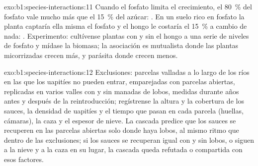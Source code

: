 \begin{solution}{exo:b1:species-interactions:11}
Cuando el fosfato limita el crecimiento, el \qty{80}{\%} del fosfato vale
mucho más que el \qty{15}{\%} del azúcar: . En un suelo rico en
fosfato la planta captaría ella misma el fosfato y el hongo le costaría el
\qty{15}{\%} a cambio de nada: . Experimento: cultívense plantas
con y sin el hongo a una serie de niveles de fosfato y mídase la biomasa; la
asociación es mutualista donde las plantas micorrizadas crecen más, y
parásita donde crecen menos.
\end{solution}

\begin{solution}{exo:b1:species-interactions:12}
Exclusiones: parcelas valladas a lo largo de los ríos en las que los
uapitíes no pueden entrar, emparejadas con parcelas abiertas, replicadas en
varios valles con y sin manadas de lobos, medidas durante años antes y
después de la reintroducción; regístrense la altura y la cobertura de los
sauces, la densidad de uapitíes y el tiempo que pasan en cada parcela
(huellas, cámaras), la caza y el espesor de nieve. La cascada predice que
los sauces se recuperen en las parcelas abiertas solo donde haya lobos, al
mismo ritmo que dentro de las exclusiones; si los sauces se recuperan igual
con y sin lobos, o siguen a la nieve y a la caza en su lugar, la cascada
queda refutada o compartida con esos factores.
\end{solution}

